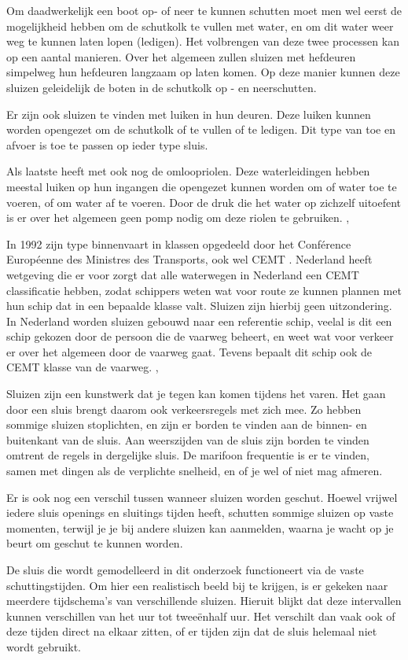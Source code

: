 \documentclass[../verslag.tex]{subfiles}
\begin{document}
Om daadwerkelijk een boot op- of neer te kunnen schutten moet men wel eerst de mogelijkheid hebben om de schutkolk te vullen met water, en om dit water weer weg te kunnen laten lopen (ledigen). Het volbrengen van deze twee processen kan op een aantal manieren. Over het algemeen zullen sluizen met hefdeuren simpelweg hun hefdeuren langzaam op laten komen. Op deze manier kunnen deze sluizen geleidelijk de boten in de schutkolk op - en neerschutten. \cite{bezuijen_2000}

Er zijn ook sluizen te vinden met luiken in hun deuren. Deze luiken kunnen worden opengezet om de schutkolk of te vullen of te ledigen. Dit type van toe en afvoer is toe te passen op ieder type sluis. \cite{bezuijen_2000}

Als laatste heeft met ook nog de omloopriolen. Deze waterleidingen hebben meestal luiken op hun ingangen die opengezet kunnen worden om of water toe te voeren, of om water af te voeren. Door de druk die het water op zichzelf uitoefent is er over het algemeen geen pomp nodig om deze riolen te gebruiken. \cite{gww_2020}, \cite{bezuijen_2000}

In 1992 zijn type binnenvaart in klassen opgedeeld door het Conférence Européenne des Ministres des Transports, ook wel CEMT \cite{cemt_1992}. Nederland heeft wetgeving die er voor zorgt dat alle waterwegen in Nederland een CEMT classificatie hebben, zodat schippers weten wat voor route ze kunnen plannen met hun schip dat in een bepaalde klasse valt. Sluizen zijn hierbij geen uitzondering. In Nederland worden sluizen gebouwd naar een referentie schip, veelal is dit een schip gekozen door de persoon die de vaarweg beheert, en weet wat voor verkeer er over het algemeen door de vaarweg gaat. Tevens bepaalt dit schip ook de CEMT klasse van de vaarweg. \cite{cemt_1992}, \cite{rws_2020}

Sluizen zijn een kunstwerk dat je tegen kan komen tijdens het varen. Het gaan door een sluis brengt daarom ook verkeersregels met zich mee. Zo hebben sommige sluizen stoplichten, en zijn er borden te vinden aan de binnen- en buitenkant van de sluis. Aan weerszijden van de sluis zijn borden te vinden omtrent de regels in dergelijke sluis. De marifoon frequentie is er te vinden, samen met dingen als de verplichte snelheid, en of je wel of niet mag afmeren. \cite{zeilen_2013}

Er is ook nog een verschil tussen wanneer sluizen worden geschut. Hoewel vrijwel iedere sluis openings en sluitings tijden heeft, schutten sommige sluizen op vaste momenten, terwijl je je bij andere sluizen kan aanmelden, waarna je wacht op je beurt om geschut te kunnen worden.

De sluis die wordt gemodelleerd in dit onderzoek functioneert via de vaste schuttingstijden. Om hier een realistisch beeld bij te krijgen, is er gekeken naar meerdere tijdschema's van verschillende sluizen. Hieruit blijkt dat deze intervallen kunnen verschillen van het uur tot tweeënhalf uur. Het verschilt dan vaak ook of deze tijden direct na elkaar zitten, of er tijden zijn dat de sluis helemaal niet wordt gebruikt. \cite{sluizen_2022}
\end{document}

